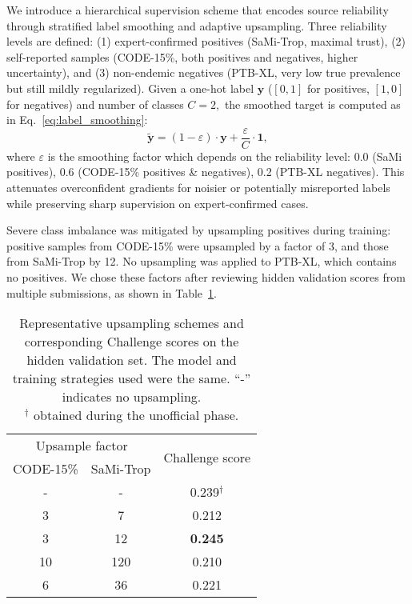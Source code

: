 \documentclass[twocolumn]{cinc}
\begin{document}
We introduce a hierarchical supervision scheme that encodes source reliability through stratified label smoothing and adaptive upsampling. Three reliability levels are defined: (1) expert-confirmed positives (SaMi-Trop, maximal trust), (2) self-reported samples (CODE-15\%, both positives and negatives, higher uncertainty), and (3) non-endemic negatives (PTB-XL, very low true prevalence but still mildly regularized). Given a one-hot label $\mathbf{y}$ ($[0, 1]$ for positives, $[1, 0]$ for negatives) and number of classes $C = 2,$ the smoothed target is computed as in Eq.~\ref{eq:label_smoothing}:
\begin{equation}
\label{eq:label_smoothing}
\tilde{\mathbf{y}} = (1 - \varepsilon) \cdot {\mathbf{y}} + \frac{\varepsilon}{C} \cdot {\mathbf{1}},
\end{equation}
where $\varepsilon$ is the smoothing factor which depends on the reliability level: 0.0 (SaMi positives), 0.6 (CODE-15\% positives \& negatives), 0.2 (PTB-XL negatives). This attenuates overconfident gradients for noisier or potentially misreported labels while preserving sharp supervision on expert-confirmed cases.

Severe class imbalance was mitigated by upsampling positives during training: positive samples from CODE-15\% were upsampled by a factor of 3, and those from SaMi-Trop by 12. No upsampling was applied to PTB-XL, which contains no positives. We chose these factors after reviewing hidden validation scores from multiple submissions, as shown in Table~\ref{tab:upsampling_schemes}.
\begin{table}[!htbp]
\centering
\begin{tabular}{ccc}
\toprule
\multicolumn{2}{c}{Upsample factor} & \multirow{2}{*}{Challenge score} \\ \cmidrule(lr){1-2}
CODE-15\% & SaMi-Trop               &                                  \\ \midrule
-         & -                       & 0.239$^\dagger$                        \\
3         & 7                       & 0.212                            \\
3         & 12                      & \textbf{0.245}                   \\
10        & 120                     & 0.210                            \\
6         & 36                      & 0.221                            \\
\bottomrule
\end{tabular}
\caption{Representative upsampling schemes and corresponding Challenge scores on the hidden validation set. The model and training strategies used were the same. “-” indicates no upsampling.\\
$^\dagger$ obtained during the unofficial phase.
}
\label{tab:upsampling_schemes}
\end{table}
\end{document}
